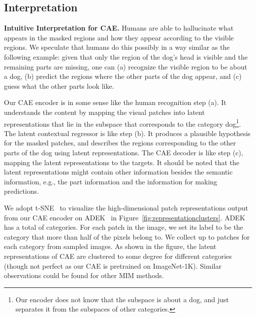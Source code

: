 \documentclass[twocolumn]{svjour3}          \smartqed  \usepackage{graphicx}
\begin{document}
\subsection{Interpretation}
\noindent\textbf{Intuitive Interpretation for CAE.}
Humans are able to
hallucinate 
what appears in the masked regions
and how they appear
according to the visible regions.
We speculate that
humans do this
possibly 
in a way similar as
the following example:
given that only the region of the dog's head
is visible and the remaining parts are missing,
one can (a) recognize the visible region 
to be about a dog,
(b) predict the regions 
where the other parts of the dog appear,
and (c) guess what the other parts look like.

Our CAE encoder is in some sense
like the human recognition step (a).
It understands the content
by
mapping the visual patches
into latent representations
that lie in the subspace that corresponds to the category dog\footnote{Our encoder does not know that the subspace is about a dog, and just separates it from the subspaces of other categories.}.
The latent contextual regressor
is like step (b).
It produces a plausible hypothesis
for the masked patches,
and describes
the regions corresponding to the other parts of the dog
using latent representations.
The CAE decoder is like step (c),
mapping the latent representations
to the targets.
It should be noted that
the latent representations 
might contain other information
besides the semantic information,
e.g., the part information
and the information for making predictions.

We adopt t-SNE~\cite{van2008visualizing}
to visualize the high-dimensional patch representations 
output from our CAE encoder 
on ADEK~\cite{zhou2017scene} in Figure~\ref{fig:representationclusters}.
ADEK has a total of  categories. 
For each patch in the image, 
we set its label to be the category
that more than half of the pixels
belong to.
We collect up to  patches for each category
from sampled  images. As shown in the figure, the latent representations of CAE are clustered to some degree for different categories (though not perfect as our CAE is pretrained on ImageNet-1K).
Similar observations could be found for other MIM methods.
\end{document}
